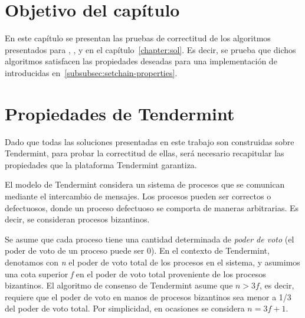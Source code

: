 \section{Objetivo del capítulo}
En este capítulo se presentan las pruebas de correctitud de los algoritmos presentados para
\vanilla, \compresschain, y \hashchain en el capítulo~\ref{chapter:sol}.
Es decir, se prueba que dichos algoritmos satisfacen las propiedades deseadas para una
implementación de \setchain introducidas en~\ref{subsubsec:setchain-properties}.

\section{Propiedades de Tendermint}\label{sec:properties}
Dado que todas las soluciones presentadas en este trabajo son construidas sobre Tendermint,
para probar la correctitud de ellas, será necesario recapitular las propiedades que la
plataforma Tendermint garantiza.

El modelo de Tendermint considera un sistema de procesos que se comunican mediante el intercambio de
mensajes.
Los procesos pueden ser correctos o defectuosos, donde un proceso defectuoso se comporta de maneras
arbitrarias. Es decir, se consideran procesos bizantinos.

Se asume que cada proceso tiene una cantidad determinada de \textit{poder de voto} (el poder de
voto de un proceso puede ser 0).
%
En el contexto de Tendermint, denotamos con \textit{n} el poder de voto total de los procesos
en el sistema, y asumimos una cota superior \textit{f} en el poder de voto total proveniente de
los procesos bizantinos.
%
El algoritmo de consenso de Tendermint asume que $n > 3f$, es decir, requiere que el poder de voto
en manos de procesos bizantinos sea menor a 1/3 del poder de voto total.
Por simplicidad, en ocasiones se considera $n = 3f + 1$.

